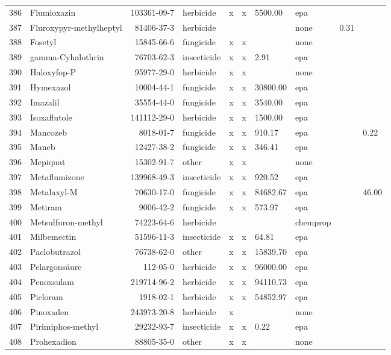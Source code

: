 \begin{longtable}{lp{3cm}rlp{0.5cm}p{0.5cm}p{1.5cm}p{1cm}p{1cm}p{1cm}}
  386 & Flumioxazin & 103361-09-7 & herbicide & x & x & 5500.00 & epa &  &  \\ 
  387 & Fluroxypyr-methylheptyl & 81406-37-3 & herbicide &  &  &  & none & 0.31 &  \\ 
  388 & Fosetyl & 15845-66-6 & fungicide & x & x &  & none &  &  \\ 
  389 & gamma-Cyhalothrin & 76703-62-3 & insecticide & x & x & 2.91 & epa &  &  \\ 
  390 & Haloxyfop-P & 95977-29-0 & herbicide & x & x &  & none &  &  \\ 
  391 & Hymexazol & 10004-44-1 & fungicide & x & x & 30800.00 & epa &  &  \\ 
  392 & Imazalil & 35554-44-0 & fungicide & x & x & 3540.00 & epa &  &  \\ 
  393 & Isoxaflutole & 141112-29-0 & herbicide & x & x & 1500.00 & epa &  &  \\ 
  394 & Mancozeb & 8018-01-7 & fungicide & x & x & 910.17 & epa &  & 0.22 \\ 
  395 & Maneb & 12427-38-2 & fungicide & x & x & 346.41 & epa &  &  \\ 
  396 & Mepiquat & 15302-91-7 & other & x & x &  & none &  &  \\ 
  397 & Metaflumizone & 139968-49-3 & insecticide & x & x & 920.52 & epa &  &  \\ 
  398 & Metalaxyl-M & 70630-17-0 & fungicide & x & x & 84682.67 & epa &  & 46.00 \\ 
  399 & Metiram & 9006-42-2 & fungicide & x & x & 573.97 & epa &  &  \\ 
  400 & Metsulfuron-methyl & 74223-64-6 & herbicide &  &  &  & chemprop &  &  \\ 
  401 & Milbemectin & 51596-11-3 & insecticide & x & x & 64.81 & epa &  &  \\ 
  402 & Paclobutrazol & 76738-62-0 & other & x & x & 15839.70 & epa &  &  \\ 
  403 & Pelargonsäure & 112-05-0 & herbicide & x & x & 96000.00 & epa &  &  \\ 
  404 & Penoxsulam & 219714-96-2 & herbicide & x & x & 94110.73 & epa &  &  \\ 
  405 & Picloram & 1918-02-1 & herbicide & x & x & 54852.97 & epa &  &  \\ 
  406 & Pinoxaden & 243973-20-8 & herbicide & x &  &  & none &  &  \\ 
  407 & Pirimiphos-methyl & 29232-93-7 & insecticide & x & x & 0.22 & epa &  &  \\ 
  408 & Prohexadion & 88805-35-0 & other & x & x &  & none &  &  \\ 

\end{longtable}
